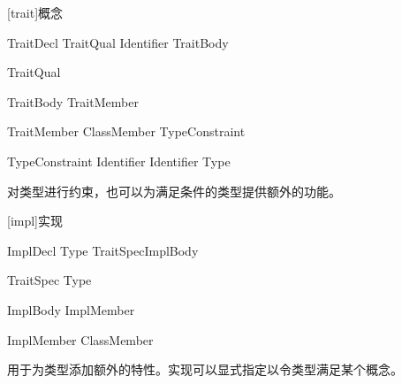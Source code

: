 
[trait]{概念}

\begin{bnf}{TraitDecl}
    TraitQual\bnfs {} Identifier TraitBody
\end{bnf}

\begin{bnf}{TraitQual}
\end{bnf}

\begin{bnf}{TraitBody}
    \terminal{\{} TraitMember\bnfs \terminal{\}}
\end{bnf}

\begin{bnf}{TraitMember}
    ClassMember \br
    TypeConstraint
\end{bnf}

\begin{bnf}{TypeConstraint}
     Identifier \terminal{;} \br
     Identifier \terminal{:} Type \terminal{;}
\end{bnf}

\pnum
{}对类型进行约束，也可以为满足条件的类型提供额外的功能。

[impl]{实现}

\begin{bnf}{ImplDecl}
     Type TraitSpec\bnfq ImplBody
\end{bnf}

\begin{bnf}{TraitSpec}
    \terminal{:} Type
\end{bnf}

\begin{bnf}{ImplBody}
    \terminal{\{} ImplMember\bnfs \terminal{\}}
\end{bnf}

\begin{bnf}{ImplMember}
    ClassMember
\end{bnf}

\pnum
{}用于为类型添加额外的特性。实现可以显式指定以令类型满足某个概念。
